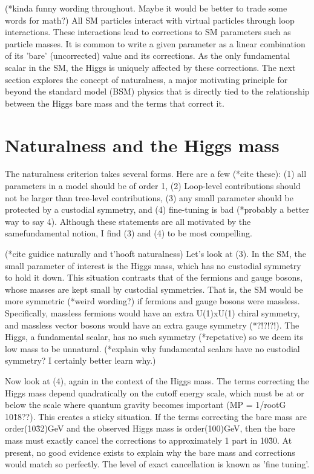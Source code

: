 \documentclass[12pt]{article}
\begin{document}
    (*kinda funny wording throughout. Maybe it would be better to trade some words for math?)
    All SM particles interact with virtual particles through loop interactions. These interactions lead to corrections to SM parameters such as particle masses. It is common to write a given parameter as a linear combination of its 'bare' (uncorrected) value and its corrections. As the only fundamental scalar in the SM, the Higgs is uniquely affected by these corrections. The next section explores the concept of naturalness, a major motivating principle for beyond the standard model (BSM) physics that is directly tied to the relationship between the Higgs bare mass and the terms that correct it.

\section{Naturalness and the Higgs mass}
    The naturalness criterion takes several forms. Here are a few (*cite these): (1) all parameters in a model should be of order 1, (2) Loop-level contributions should not be larger than tree-level contributions, (3) any small parameter should be protected by a custodial symmetry, and (4) fine-tuning is bad (*probably a better way to say 4). Although these statements are all motivated by the samefundamental notion, I find (3) and (4) to be most compelling.

    (*cite guidice naturally and t'hooft naturalness)
    Let's look at (3). In the SM, the small parameter of interest is the Higgs mass, which has no custodial symmetry to hold it down. This situation contrasts that of the fermions and gauge bosons, whose masses are kept small by custodial symmetries. That is, the SM would be more symmetric (*weird wording?) if fermions and gauge bosons were massless. Specifically, massless fermions would have an extra U(1)xU(1) chiral symmetry, and massless vector bosons would have an extra gauge symmetry (*?!?!?!). The Higgs, a fundamental scalar, has no such symmetry (*repetative) so we deem its low mass to be unnatural. (*explain why fundamental scalars have no custodial symmetry? I certainly better learn why.)

    Now look at (4), again in the context of the Higgs mass. The terms correcting the Higgs mass depend quadratically on the cutoff energy scale, which must be at or below the scale where quantum gravity becomes important (MP = 1/rootG ~ 10\^18??). This creates a sticky situation. If the terms correcting the bare mass are order(10\^32)GeV and the observed Higgs mass is order(100)GeV, then the bare mass must exactly cancel the corrections to approximately 1 part in 10\^30. At present, no good evidence exists to explain why the bare mass and corrections would match so perfectly. The level of exact cancellation is known as 'fine tuning'.
\end{document}
